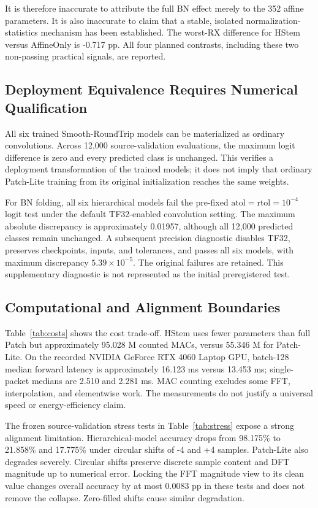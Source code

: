 \documentclass[journal]{IEEEtran}
\newcommand{\method}{HStem}
\begin{document}
It is therefore inaccurate to attribute the full BN effect merely to the 352 affine parameters. It is also inaccurate to claim that a stable, isolated normalization-statistics mechanism has been established. The worst-RX difference for \method{} versus AffineOnly is -0.717 pp. All four planned contrasts, including these two non-passing practical signals, are reported.

\subsection{Deployment Equivalence Requires Numerical Qualification}
All six trained Smooth-RoundTrip models can be materialized as ordinary convolutions. Across 12,000 source-validation evaluations, the maximum logit difference is zero and every predicted class is unchanged. This verifies a deployment transformation of the trained models; it does not imply that ordinary Patch-Lite training from its original initialization reaches the same weights.

For BN folding, all six hierarchical models fail the pre-fixed $\mathrm{atol}=\mathrm{rtol}=10^{-4}$ logit test under the default TF32-enabled convolution setting. The maximum absolute discrepancy is approximately 0.01957, although all 12,000 predicted classes remain unchanged. A subsequent precision diagnostic disables TF32, preserves checkpoints, inputs, and tolerances, and passes all six models, with maximum discrepancy $5.39\times10^{-5}$. The original failures are retained. This supplementary diagnostic is not represented as the initial preregistered test.

\subsection{Computational and Alignment Boundaries}

Table~\ref{tab:costs} shows the cost trade-off. \method{} uses fewer parameters than full Patch but approximately 95.028 M counted MACs, versus 55.346 M for Patch-Lite. On the recorded NVIDIA GeForce RTX 4060 Laptop GPU, batch-128 median forward latency is approximately 16.123 ms versus 13.453 ms; single-packet medians are 2.510 and 2.281 ms. MAC counting excludes some FFT, interpolation, and elementwise work. The measurements do not justify a universal speed or energy-efficiency claim.


The frozen source-validation stress tests in Table~\ref{tab:stress} expose a strong alignment limitation. Hierarchical-model accuracy drops from 98.175\% to 21.858\% and 17.775\% under circular shifts of -4 and +4 samples. Patch-Lite also degrades severely. Circular shifts preserve discrete sample content and DFT magnitude up to numerical error. Locking the FFT magnitude view to its clean value changes overall accuracy by at most 0.0083 pp in these tests and does not remove the collapse. Zero-filled shifts cause similar degradation.
\end{document}
